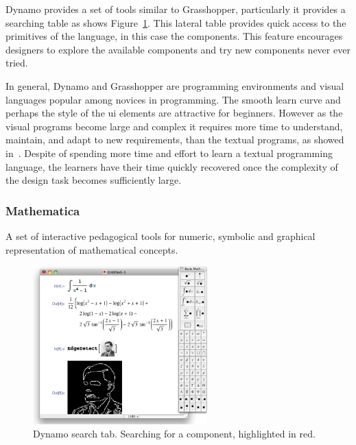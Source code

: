 Dynamo provides a set of tools similar to Grasshopper, particularly it provides a searching table as shows Figure~\ref{fig:dynam}. This lateral table provides quick access to the primitives of the language, in this case the components. This feature encourages designers to explore the available components and try new components never ever tried.  

In general, Dynamo and Grasshopper are programming environments and visual languages popular among novices in programming. The smooth learn curve and perhaps the style of the \ac{ui} elements are attractive for beginners. However as the visual programs become large and complex it requires more time to understand, maintain, and adapt to new requirements, than the textual programs, as showed in~\cite{leitao2011programming}. Despite of spending more time and effort to learn a textual programming language, the learners have their time quickly recovered once the complexity of the design task becomes sufficiently large.
\subsubsection{Mathematica~\cite{wolfram1991mathematica}} A set of interactive pedagogical tools for numeric, symbolic and graphical representation of mathematical concepts.

\begin{figure}
  \vspace{-20pt}
  \begin{center}
    \includegraphics[width=0.6\textwidth]{img/mathematica}
  \end{center}
  \vspace{-15pt}
 \caption{Dynamo search tab. Searching for a component, highlighted in red.}  
  \vspace{-15pt}
    \label{fig:dynam}
\end{figure}


